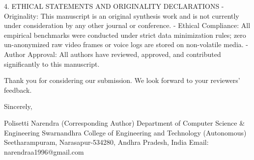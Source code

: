 4. ETHICAL STATEMENTS AND ORIGINALITY DECLARATIONS
  - Originality: This manuscript is an original synthesis work and is not currently under consideration by any other journal or conference.
  - Ethical Compliance: All empirical benchmarks were conducted under strict data minimization rules; zero un-anonymized raw video frames or voice logs are stored on non-volatile media.
  - Author Approval: All authors have reviewed, approved, and contributed significantly to this manuscript.

Thank you for considering our submission. We look forward to your reviewers' feedback.

Sincerely,

Polisetti Narendra (Corresponding Author)
Department of Computer Science & Engineering
Swarnandhra College of Engineering and Technology (Autonomous)
Seetharampuram, Narasapur-534280, Andhra Pradesh, India
Email: narendraa1996@gmail.com
